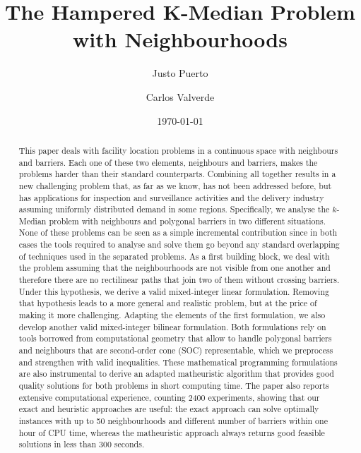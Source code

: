 \documentclass[a4paper,  review, authoryear, 1p.]{elsarticle}
\begin{document}
	
	\begin{frontmatter}
		
		\title{The Hampered K-Median Problem with Neighbourhoods}
		
		\author[1]{Justo Puerto}%
		\author[2]{Carlos Valverde}
		
		\address[1]{Institute of Mathematics (IMUS) and Department of Statistics and Operations Research, University of Seville, Seville, 41012, Spain}
		\address[2]{Institute of Mathematics (IMUS) and Department of Statistics and Operations Research, University of Seville, Seville, 41012, Spain}
		
		
		\date{\today}
		
		
		\begin{abstract}
			This paper deals with facility location problems in a continuous space with neighbours and barriers. Each one of these two elements, neighbours and barriers, makes the problems harder than their standard counterparts. Combining all together results in a new challenging problem that, as far as we know, has not been addressed before, but has applications for inspection and surveillance activities and the delivery industry assuming uniformly distributed demand in some regions. Specifically, we analyse the $k$-Median problem with neighbours and polygonal barriers in two different situations. None of these problems can be  seen as a simple incremental contribution since in both cases the tools required to analyse and solve them go beyond any standard overlapping of techniques used in the separated problems. As a first building block, we deal with the problem assuming that the neighbourhoods are not visible from one another and therefore there are no rectilinear paths that join two of them without crossing barriers. Under this hypothesis, we derive a valid mixed-integer linear formulation. Removing that hypothesis leads to a more general and realistic problem, but at the price of making it more challenging. Adapting the elements of the first formulation, we also develop another valid mixed-integer bilinear formulation.  Both formulations rely on tools borrowed from computational geometry that allow to handle polygonal barriers and neighbours that are second-order cone (SOC) representable, which we preprocess and strengthen with valid inequalities. These mathematical programming formulations are also instrumental to derive an adapted matheuristic algorithm that provides good quality solutions for both problems in short computing time. The paper also reports extensive computational experience, counting 2400 experiments, showing that our exact and heuristic approaches are useful: the exact approach can solve optimally instances with up to 50 neighbourhoods and different number of barriers within one hour of CPU time, whereas the matheuristic approach always returns good feasible solutions in less than 300 seconds.
		\end{abstract}
		

\end{frontmatter}
\end{document}
